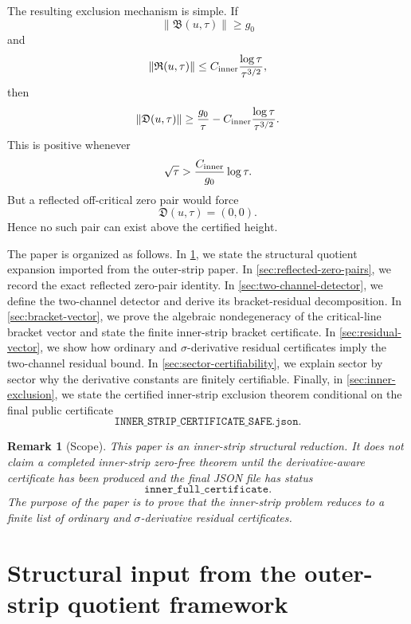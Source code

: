 \documentclass[11pt]{article}
\newtheorem{remark}[theorem]{Remark}
\newcommand{\Dvec}{\mathfrak D}
\newcommand{\Bvec}{\mathfrak B}
\newcommand{\Rvec}{\mathfrak R}
\newcommand{\gev}{g_0}
\newcommand{\Cinner}{C_{\rm inner}}
\begin{document}
The resulting exclusion mechanism is simple.  If
\[
        \|\Bvec(u,\tau)\|\ge \gev
\]
and
\[
        \|\Rvec(u,\tau)\|
        \le
        \Cinner
        \frac{\log\tau}{\tau^{3/2}},
\]
then
\[
        \|\Dvec(u,\tau)\|
        \ge
        \frac{\gev}{\tau}
        -
        \Cinner
        \frac{\log\tau}{\tau^{3/2}}.
\]
This is positive whenever
\[
        \sqrt{\tau}
        >
        \frac{\Cinner}{\gev}
        \log\tau.
\]
But a reflected off-critical zero pair would force
\[
        \Dvec(u,\tau)=(0,0).
\]
Hence no such pair can exist above the certified height.

The paper is organized as follows.  In
\cref{sec:structural-input}, we state the structural quotient expansion
imported from the outer-strip paper.  In
\cref{sec:reflected-zero-pairs}, we record the exact reflected zero-pair
identity.  In \cref{sec:two-channel-detector}, we define the two-channel
detector and derive its bracket-residual decomposition.  In
\cref{sec:bracket-vector}, we prove the algebraic nondegeneracy of the
critical-line bracket vector and state the finite inner-strip bracket
certificate.  In \cref{sec:residual-vector}, we show how ordinary and
\(\sigma\)-derivative residual certificates imply the two-channel residual
bound.  In \cref{sec:sector-certifiability}, we explain sector by sector why
the derivative constants are finitely certifiable.  Finally, in
\cref{sec:inner-exclusion}, we state the certified inner-strip exclusion
theorem conditional on the final public certificate
\[
        \texttt{INNER\_STRIP\_CERTIFICATE\_SAFE.json}.
\]

\begin{remark}[Scope]
This paper is an inner-strip structural reduction.  It does not claim a
completed inner-strip zero-free theorem until the derivative-aware certificate
has been produced and the final JSON file has status
\[
        \texttt{inner\_full\_certificate}.
\]
The purpose of the paper is to prove that the inner-strip problem reduces to a
finite list of ordinary and \(\sigma\)-derivative residual certificates.
\end{remark}


\section{Structural input from the outer-strip quotient framework}
\label{sec:structural-input}
\end{document}
